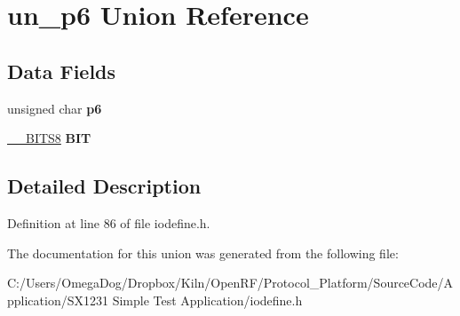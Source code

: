 \hypertarget{unionun__p6}{\section{un\-\_\-p6 Union Reference}
\label{unionun__p6}
}
\subsection*{Data Fields}
\begin{DoxyCompactItemize}
\item 
\hypertarget{unionun__p6_a0fabeafd4fa9ddc18915165149978452}{unsigned char {\bfseries p6}}\label{unionun__p6_a0fabeafd4fa9ddc18915165149978452}

\item 
\hypertarget{unionun__p6_a0a852c41b7c4eacaf91239ad0239f445}{\hyperlink{struct_____b_i_t_s8}{\-\_\-\-\_\-\-B\-I\-T\-S8} {\bfseries B\-I\-T}}\label{unionun__p6_a0a852c41b7c4eacaf91239ad0239f445}

\end{DoxyCompactItemize}


\subsection{Detailed Description}


Definition at line 86 of file iodefine.\-h.



The documentation for this union was generated from the following file\-:\begin{DoxyCompactItemize}
\item 
C\-:/\-Users/\-Omega\-Dog/\-Dropbox/\-Kiln/\-Open\-R\-F/\-Protocol\-\_\-\-Platform/\-Source\-Code/\-Application/\-S\-X1231 Simple Test Application/iodefine.\-h\end{DoxyCompactItemize}
